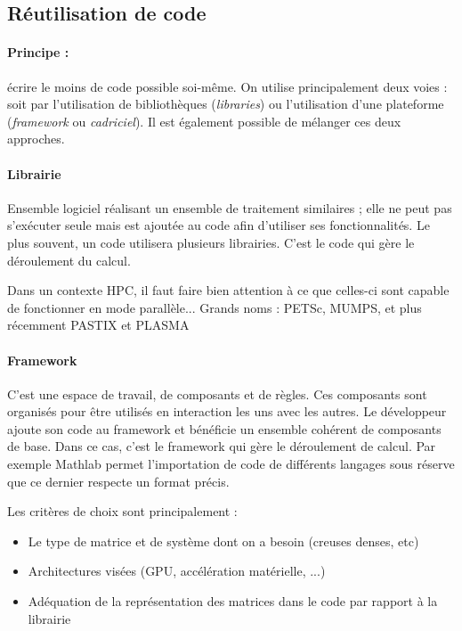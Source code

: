 \documentclass{article}
\begin{document}
\subsection{Réutilisation de code}
\paragraph{Principe :} écrire le moins de code possible soi-même. On utilise principalement deux voies : soit par l'utilisation de bibliothèques (\emph{libraries}) ou l'utilisation d'une plateforme (\emph{framework} ou \emph{cadriciel}). Il est également possible de mélanger ces deux approches.

\paragraph{Librairie}
Ensemble logiciel réalisant un ensemble de traitement similaires ; elle ne peut pas s'exécuter seule mais est ajoutée au code afin d'utiliser ses fonctionnalités. Le plus souvent, un code utilisera plusieurs librairies. C'est le code qui gère le déroulement du calcul.

Dans un contexte HPC, il faut faire bien attention à ce que celles-ci sont capable de fonctionner en mode parallèle... Grands noms : PETSc, MUMPS, et plus récemment PASTIX et PLASMA

\paragraph{Framework}
C'est une espace de travail, de composants et de règles. Ces composants sont organisés pour être utilisés en interaction les uns avec les autres. Le développeur ajoute son code au framework et bénéficie un ensemble cohérent de composants de base. Dans ce cas, c'est le framework qui gère le déroulement de calcul. Par exemple Mathlab permet l'importation de code de différents langages sous réserve que ce dernier respecte un format précis.
\bigskip

Les critères de choix sont principalement :
\begin{itemize}
\item Le type de matrice et de système dont on a besoin (creuses denses, etc)
\item Architectures visées (GPU, accélération matérielle, ...)
\item Adéquation de la représentation des matrices dans le code par rapport à la librairie
\end{itemize}
\bigskip
\end{document}
